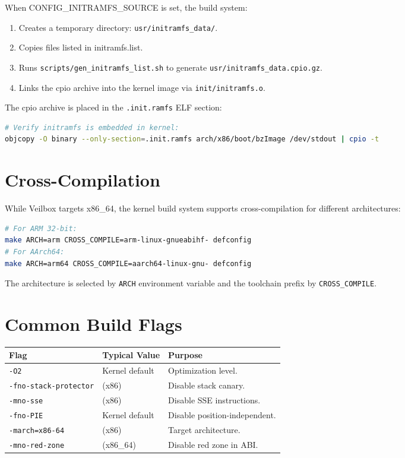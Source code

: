 When CONFIG\_INITRAMFS\_SOURCE is set, the build system:

\begin{enumerate}[nosep]
  \item Creates a temporary directory: \texttt{usr/initramfs\_data/}.
  \item Copies files listed in initramfs.list.
  \item Runs \texttt{scripts/gen\_initramfs\_list.sh} to generate
        \texttt{usr/initramfs\_data.cpio.gz}.
  \item Links the cpio archive into the kernel image via
        \texttt{init/initramfs.o}.
\end{enumerate}

The cpio archive is placed in the \texttt{.init.ramfs} ELF section:

\begin{lstlisting}[language=bash]
# Verify initramfs is embedded in kernel:
objcopy -O binary --only-section=.init.ramfs arch/x86/boot/bzImage /dev/stdout | cpio -t
\end{lstlisting}

\section{Cross-Compilation}

While Veilbox targets x86\_64, the kernel build system supports
cross-compilation for different architectures:

\begin{lstlisting}[language=bash]
# For ARM 32-bit:
make ARCH=arm CROSS_COMPILE=arm-linux-gnueabihf- defconfig
# For AArch64:
make ARCH=arm64 CROSS_COMPILE=aarch64-linux-gnu- defconfig
\end{lstlisting}

The architecture is selected by \texttt{ARCH} environment variable and
the toolchain prefix by \texttt{CROSS\_COMPILE}.

\section{Common Build Flags}

\begin{longtable}{|p{4cm}|p{4cm}|p{4cm}|}
\hline
\textbf{Flag} & \textbf{Typical Value} & \textbf{Purpose} \\
\hline
\texttt{-O2} & Kernel default & Optimization level. \\
\texttt{-fno-stack-protector} & (x86) & Disable stack canary. \\
\texttt{-mno-sse} & (x86) & Disable SSE instructions. \\
\texttt{-fno-PIE} & Kernel default & Disable position-independent. \\
\texttt{-march=x86-64} & (x86) & Target architecture. \\
\texttt{-mno-red-zone} & (x86\_64) & Disable red zone in ABI. \\
\hline
\end{longtable}


